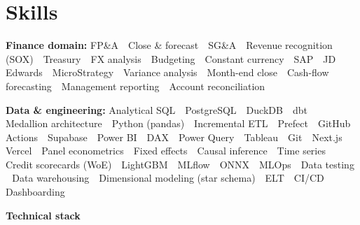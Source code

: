 \documentclass[a4paper,10pt]{article}
\begin{document}
\section*{Skills}
\textbf{\color{ink}Finance domain:} FP\&A \,\textperiodcentered\, Close \& forecast \,\textperiodcentered\, SG\&A \,\textperiodcentered\, Revenue recognition (SOX) \,\textperiodcentered\, Treasury \,\textperiodcentered\, FX analysis \,\textperiodcentered\, Budgeting \,\textperiodcentered\, Constant currency \,\textperiodcentered\, SAP \,\textperiodcentered\, JD Edwards \,\textperiodcentered\, MicroStrategy \,\textperiodcentered\, Variance analysis \,\textperiodcentered\, Month-end close \,\textperiodcentered\, Cash-flow forecasting \,\textperiodcentered\, Management reporting \,\textperiodcentered\, Account reconciliation\par\vspace{3pt}
\textbf{\color{ink}Data \& engineering:} Analytical SQL \,\textperiodcentered\, PostgreSQL \,\textperiodcentered\, DuckDB \,\textperiodcentered\, dbt \,\textperiodcentered\, Medallion architecture \,\textperiodcentered\, Python (pandas) \,\textperiodcentered\, Incremental ETL \,\textperiodcentered\, Prefect \,\textperiodcentered\, GitHub Actions \,\textperiodcentered\, Supabase \,\textperiodcentered\, Power BI \,\textperiodcentered\, DAX \,\textperiodcentered\, Power Query \,\textperiodcentered\, Tableau \,\textperiodcentered\, Git \,\textperiodcentered\, Next.js \,\textperiodcentered\, Vercel \,\textperiodcentered\, Panel econometrics \,\textperiodcentered\, Fixed effects \,\textperiodcentered\, Causal inference \,\textperiodcentered\, Time series \,\textperiodcentered\, Credit scorecards (WoE) \,\textperiodcentered\, LightGBM \,\textperiodcentered\, MLflow \,\textperiodcentered\, ONNX \,\textperiodcentered\, MLOps \,\textperiodcentered\, Data testing \,\textperiodcentered\, Data warehousing \,\textperiodcentered\, Dimensional modeling (star schema) \,\textperiodcentered\, ELT \,\textperiodcentered\, CI/CD \,\textperiodcentered\, Dashboarding\par\vspace{3pt}
\textbf{\color{ink}Technical stack}\par\vspace{2pt}
\end{document}
